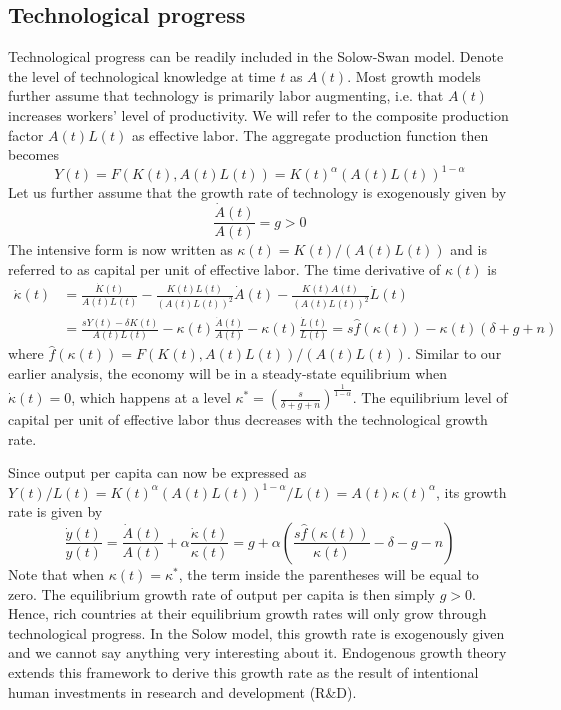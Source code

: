 \documentclass[\topdir/lecture\_notes.tex]{subfiles}
\begin{document}
\subsection{Technological progress}
Technological progress can be readily included in the Solow-Swan model.
Denote the level of technological knowledge at time \(t\) as \(A(t)\).
Most growth models further assume that technology is primarily labor augmenting, i.e. that \(A(t)\) increases workers' level of productivity.
We will refer to the composite production factor \(A(t) L(t)\) as effective labor.
The aggregate production function then becomes
\begin{equation}
  Y(t)=F(K(t), A(t) L(t))=K(t)^{\alpha}(A(t) L(t))^{1-\alpha}
  \label{eq:solow-production-tech}
\end{equation}
Let us further assume that the growth rate of technology is exogenously given by
\begin{equation}
  \frac{\dot{A}(t)}{A(t)}=g>0
  \label{eq:solow-tech-growth}
\end{equation}
The intensive form is now written as \(\kappa(t)=K(t) / (A(t) L(t))\) and is referred to as capital per unit of effective labor.
The time derivative of \(\kappa(t)\) is
\begin{equation}
\begin{aligned}
\dot{\kappa}(t) & =\frac{\dot{K}(t)}{A(t) L(t)}-\frac{K(t) L(t)}{(A(t) L(t))^{2}} \dot{A}(t)-\frac{K(t) A(t)}{(A(t) L(t))^{2}} \dot{L}(t) \\
& =\frac{s Y(t)-\delta K(t)}{A(t) L(t)}-\kappa(t) \frac{\dot{A}(t)}{A(t)}-\kappa(t) \frac{\dot{L}(t)}{L(t)}=s \hat{f}(\kappa(t))-\kappa(t)(\delta+g+n)
\end{aligned}
\label{eq:solow-kappa-dot}
\end{equation}
where \(\hat{f}(\kappa(t))=F(K(t), A(t) L(t)) / (A(t) L(t))\).
Similar to our earlier analysis, the economy will be in a steady-state equilibrium when \(\dot{\kappa}(t)=0\), which happens at a level \(\kappa^{*}=\left(\frac{s}{\delta+g+n}\right)^{\frac{1}{1-\alpha}}\).
The equilibrium level of capital per unit of effective labor thus decreases with the technological growth rate.

Since output per capita can now be expressed as \(Y(t) / L(t)=K(t)^{\alpha}(A(t) L(t))^{1-\alpha} / L(t)=A(t) \kappa(t)^{\alpha}\), its growth rate is given by
\begin{equation}
  \frac{\dot{y}(t)}{y(t)}=\frac{\dot{A}(t)}{A(t)}+\alpha \frac{\dot{\kappa}(t)}{\kappa(t)}=g+\alpha\left(\frac{s \hat{f}(\kappa(t))}{\kappa(t)}-\delta-g-n\right)
  \label{eq:solow-output-growth-tech}
\end{equation}
Note that when \(\kappa(t)=\kappa^{*}\), the term inside the parentheses will be equal to zero.
The equilibrium growth rate of output per capita is then simply \(g>0\).
Hence, rich countries at their equilibrium growth rates will only grow through technological progress.
In the Solow model, this growth rate is exogenously given and we cannot say anything very interesting about it.
Endogenous growth theory extends this framework to derive this growth rate as the result of intentional human investments in research and development (R\&D).
\end{document}
